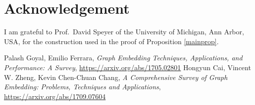 \documentclass[12pt, a4paper]{amsart}
\begin{document}
\section{Acknowledgement}
I am grateful to Prof.~David Speyer of the University
of Michigan, Ann Arbor, USA, for the construction used in the proof of Proposition \ref{mainprop}.
\begin{thebibliography}{999}
 Palash Goyal, Emilio Ferrara, {\it Graph Embedding Techniques, Applications, and Performance: A Survey}, \url{https://arxiv.org/abs/1705.02801}
 Hongyun Cai, Vincent W. Zheng, Kevin Chen-Chuan Chang, {\it A Comprehensive Survey of Graph Embedding: Problems, Techniques and Applications}, \url{https://arxiv.org/abs/1709.07604}
\end{thebibliography}
\end{document}
